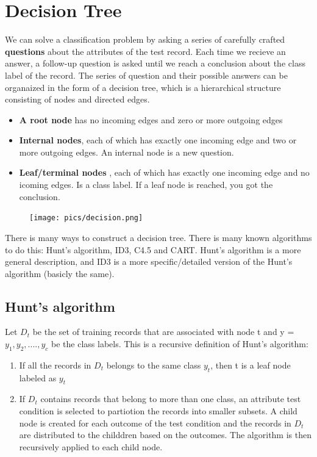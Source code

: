 	\section{Decision Tree}

		We can solve a classification problem by asking a series of carefully
		crafted {\bf questions} about the attributes of the test record. 
		Each time we recieve an answer, a follow-up question is asked until
		we reach a conclusion about the class label of the record. The series
		of question and their possible answers can be organaized in the form of
		a decision tree, which is a hierarchical structure consisting of nodes
		and directed edges.

		\begin{itemize}
			\item {\bf A root node} has no incoming edges and zero or more outgoing edges
			\item {\bf Internal nodes}, each of which has exactly one incoming edge and 
			two or more outgoing edges. An internal node is a new question.  
			\item{\bf Leaf/terminal nodes} , each of which has exactly one incoming edge
			and no icoming edges. Is a class label. If a leaf node is reached, you got the
			conclusion. 
		\end{itemize}

		\begin{figure}[H]
			\centering
			\texttt{[image: pics/decision.png]}
		\end{figure}

		There is many ways to construct a decision tree. There is many known algorithms to
		do this: Hunt's algorithm, ID3, C4.5 and CART. 
		Hunt's algorithm is a more general description, and ID3 is a more specific/detailed
		version of the Hunt's algorithm (basicly the same).

\clearpage
		\subsection*{Hunt's algorithm} 
		Let $D_{t}$ be the set of training records that are 
		associated with node t and y = {$y_{1}, y_{2}, ...., y_{c}$} be the class labels. 
		This is a recursive definition of Hunt's algorithm:
		\begin{enumerate}
			\item If all the records in $D_{t}$ belongs to the same class $y_{t}$, then
			t is a leaf node labeled as $y_{t}$
			\item If $D_{t}$ contains records that belong to more than one class, an
			attribute test condition is selected to partiotion the records into smaller
			subsets. A child node is created for each outcome of the test condition and 
			the records in $D_{t}$ are distributed to the childdren based on the outcomes. 
			The algorithm is then recursively applied to each child node. 
		\end{enumerate} 

